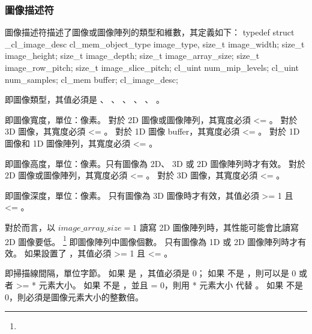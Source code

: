 \subsubsection[tit:imgDsc]{圖像描述符}

圖像描述符描述了圖像或圖像陣列的類型和維數，其定義如下：
\startclc
typedef struct _cl_image_desc {
	cl_mem_object_type	image_type,
	size_t			image_width;
	size_t			image_height;
	size_t			image_depth;
	size_t			image_array_size;
	size_t			image_row_pitch;
	size_t			image_slice_pitch;
	cl_uint			num_mip_levels;
	cl_uint			num_samples;
	cl_mem			buffer;
} cl_image_desc;
\stopclc

 即圖像類型，其值必須是 、
 、 、
 、 、
 。

 即圖像寬度，單位：像素。
對於 2D 圖像或圖像陣列，其寬度必須 <= 。
對於 3D 圖像，其寬度必須 <= 。
對於 1D 圖像 buffer，其寬度必須 <= 。
對於 1D 圖像和 1D 圖像陣列，其寬度必須 <= 。

 即圖像高度，單位：像素。只有圖像為 2D、 3D 或 2D 圖像陣列時才有效。
對於 2D 圖像或圖像陣列，其寬度必須 <= 。
對於 3D 圖像，其寬度必須 <= 。

 即圖像深度，單位：像素。
只有圖像為 3D 圖像時才有效，其值必須 >= 1 且 <= 。

\startbuffer[footnoteimagearraysize]
對於而言，以 $image\_array\_size = 1$ 讀寫 2D 圖像陣列時，其性能可能會比讀寫 2D 圖像要低。
\stopbuffer
{}\footnote{\getbuffer[footnoteimagearraysize]} 即圖像陣列中圖像個數。
只有圖像為 1D 或 2D 圖像陣列時才有效。
如果設置了 ，其值必須 >= 1 且 <= 。

 即掃描線間隔，單位字節。
如果  是 ，其值必須是 0；
如果  不是 ，則可以是 0 或者 >=  * 元素大小。
如果  不是 ，並且  = 0，則用  * 元素大小 代替 。
如果  不是 0，則必須是圖像元素大小的整數倍。

